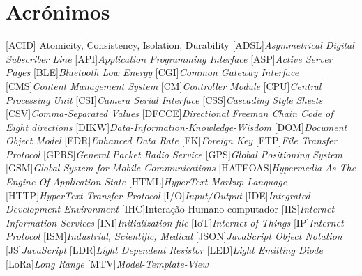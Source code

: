 
\chapter*{Acrónimos}

\begin{multicols}{2}
	
\begin{acronym}[RELAX NG]
	[ACID]{ Atomicity, Consistency, Isolation, Durability}
	[ADSL]{\textit{Asymmetrical Digital Subscriber Line}}
	[API]{\textit{Application Programming Interface}}
	[ASP]{\textit{Active Server Pages}}
	[BLE]{\textit{Bluetooth Low Energy}}
	[CGI]{\textit{Common Gateway Interface}}
	[CMS]{\textit{Content Management System}}
	[CM]{\textit{Controller Module}}
	[CPU]{\textit{Central Processing Unit}}
	[CSI]{\textit{Camera Serial Interface}}
	[CSS]{\textit{Cascading Style Sheets}}
	[CSV]{\textit{Comma-Separated Values}}
	[DFCCE]{\textit{Directional Freeman Chain Code of Eight directions}}
	[DIKW]{\textit{Data-Information-Knowledge-Wisdom}}
	[DOM]{\textit{Document Object Model}}
	[EDR]{\textit{Enhanced Data Rate}}
	[FK]{\textit{Foreign Key}}
	[FTP]{\textit{File Transfer Protocol}}
	[GPRS]{\textit{General Packet Radio Service}}
	[GPS]{\textit{Global Positioning System}}
	[GSM]{\textit{Global System for Mobile Communications}}
	[HATEOAS]{\textit{Hypermedia As The Engine Of Application State}}
	[HTML]{\textit{HyperText Markup Language}}
	[HTTP]{\textit{HyperText Transfer Protocol}}
	[I/O]{\textit{Input/Output}}
	[IDE]{\textit{Integrated Development Environment}}
	[IHC]{Interação Humano-computador}
	[IIS]{\textit{Internet Information Services}}
	[INI]{\textit{Initialization file}}
	[IoT]{\textit{Internet of Things}}
	[IP]{\textit{Internet Protocol}}
	[ISM]{\textit{Industrial, Scientific, Medical}}
	[JSON]{\textit{JavaScript Object Notation}}
	[JS]{\textit{JavaScript}}
	[LDR]{\textit{Light Dependent Resistor}}
	[LED]{\textit{Light Emitting Diode}}
	[LoRa]{\textit{Long Range}}
	[MTV]{\textit{Model-Template-View}}

\end{acronym}
\end{multicols}

